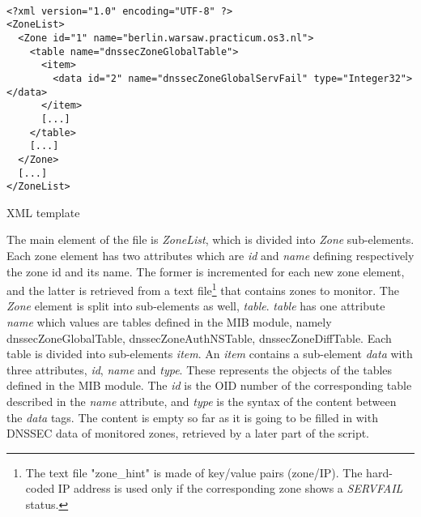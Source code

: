 \begin{listing}
\begin{verbatim}

<?xml version="1.0" encoding="UTF-8" ?>
<ZoneList>
  <Zone id="1" name="berlin.warsaw.practicum.os3.nl">
    <table name="dnssecZoneGlobalTable">
      <item>
        <data id="2" name="dnssecZoneGlobalServFail" type="Integer32"> </data>
      </item>
      [...]
    </table>
    [...]
  </Zone>
  [...]
</ZoneList>
\end{verbatim}
\caption{XML template}
\label{listing:xml}
\end{listing}
The main element of the file is \textit{ZoneList}, which is divided into \textit{Zone} sub-elements. Each zone element has two attributes which are \textit{id} and \textit{name} defining respectively the zone id and its name. The former is incremented for each new zone element, and the latter is retrieved from a text file\footnote{The text file "zone\_hint" is made of key/value pairs (zone/IP). The hard-coded IP address is used only if the corresponding zone shows a \textit{SERVFAIL} status.} that contains zones to monitor. The \textit{Zone} element is split into sub-elements as well, \textit{table}. \textit{table} has one attribute \textit{name} which values are tables defined in the MIB module, namely dnssecZoneGlobalTable, dnssecZoneAuthNSTable, dnssecZoneDiffTable. Each table is divided into sub-elements \textit{item}. An \textit{item} contains a sub-element \textit{data} with three attributes, \textit{id}, \textit{name} and \textit{type}. These represents the objects of the tables defined in the MIB module. The \textit{id} is the OID number of the corresponding table described in the \textit{name} attribute, and \textit{type} is the syntax of the content between the \textit{data} tags. The content is empty so far as it is going to be filled in with DNSSEC data of monitored zones, retrieved by a later part of the script.

